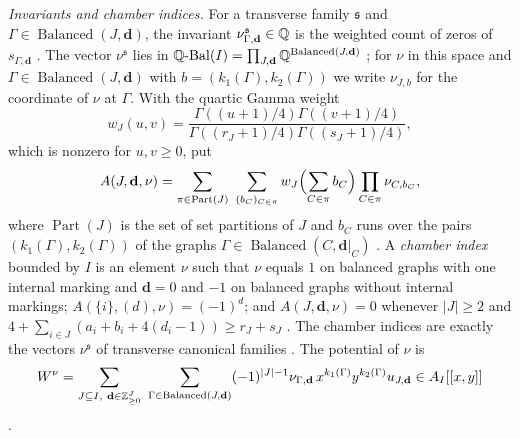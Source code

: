 \emph{Invariants and chamber indices.}  For a transverse family
$\mathfrak s$ and $\Gamma\in\operatorname{Balanced}(J,\mathbf d)$, the
invariant $\nu^{\mathfrak s}_{\Gamma,\mathbf d}\in\mathbb Q$ is the weighted count
of zeros of $s_{\Gamma,\mathbf d}$ \cite[(3.20) and
Def.~3.32]{grossetal2022open}.  The vector $\nu^{\mathfrak s}$ lies in
$\mathbb Q\text{-}\mathrm{Bal}(I)=\prod_{J,\mathbf d}
\mathbb Q^{\operatorname{Balanced}(J,\mathbf d)}$ \cite[(0.3)]{grossetal2022open};
for $\nu$ in this space and $\Gamma\in\operatorname{Balanced}(J,\mathbf d)$
with $b=(k_1(\Gamma),k_2(\Gamma))$ we write $\nu_{J,b}$ for the coordinate
of $\nu$ at $\Gamma$.  With the quartic Gamma weight
\begin{equation}\label{eq:quartic-Gamma-weight}
 w_J(u,v)=
 \frac{\Gamma((u+1)/4)\Gamma((v+1)/4)}
      {\Gamma((r_J+1)/4)\Gamma((s_J+1)/4)},
\end{equation}
which is nonzero for $u,v\geq0$, put
\[
 A(J,\mathbf d,\nu)
 =\sum_{\pi\in\operatorname{Part}(J)}\ \sum_{(b_C)_{C\in\pi}}
 w_J\Bigl(\sum_{C\in\pi}b_C\Bigr)\prod_{C\in\pi}\nu_{C,b_C},
\]
where $\operatorname{Part}(J)$ is the set of set partitions of $J$ and $b_C$
runs over the pairs $(k_1(\Gamma),k_2(\Gamma))$ of the graphs
$\Gamma\in\operatorname{Balanced}(C,\mathbf d|_C)$
\cite[Notation~3.42]{grossetal2022open}.  A \emph{chamber index} bounded by
$I$ is an element $\nu$ such that $\nu$ equals $1$ on balanced graphs with one
internal marking and $\mathbf d=0$ and $-1$ on balanced graphs without
internal markings; $A(\{i\},(d),\nu)=(-1)^d$; and $A(J,\mathbf d,\nu)=0$
whenever $|J|\geq2$ and $4+\sum_{i\in J}(a_i+b_i+4(d_i-1))\geq r_J+s_J$
\cite[Def.~3.47]{grossetal2022open}.  The chamber indices are exactly the
vectors $\nu^{\mathfrak s}$ of transverse canonical families
\cite[Cor.~5.14]{grossetal2022open}.  The potential of $\nu$ is
\[
 W^\nu=\sum_{J\subseteq I,\ \mathbf d\in\mathbb Z^J_{\geq0}}\
 \sum_{\Gamma\in\operatorname{Balanced}(J,\mathbf d)}
 (-1)^{|J|-1}\nu_{\Gamma,\mathbf d}\,
 x^{k_1(\Gamma)}y^{k_2(\Gamma)}u_{J,\mathbf d}
 \in A_I[[x,y]]
\]
\cite[Def.~4.6]{grossetal2022open}.


